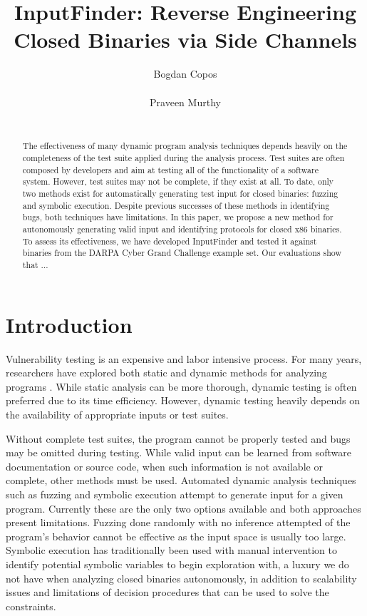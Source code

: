 \documentclass{acm_proc_article-sp}
\def \tool {InputFinder}
\begin{document}
\title{InputFinder: Reverse Engineering Closed Binaries via Side Channels}
\author{
\alignauthor
Bogdan Copos\\
	\\
\alignauthor
Praveen Murthy\\
	\\
}
\maketitle

\begin{abstract}
The effectiveness of many dynamic program analysis techniques depends heavily on the completeness of the test suite applied during the analysis process.
Test suites are often composed by developers and aim at testing all of the functionality of a software system.
However, test suites may not be complete, if they exist at all.
To date, only two methods exist for automatically generating test input for closed binaries: fuzzing and symbolic execution.
Despite previous successes of these methods in identifying bugs, both techniques have limitations.
In this paper, we propose a new method for autonomously generating valid input and identifying protocols for closed x86 binaries.
To assess its effectiveness, we have developed \tool{} and tested it against binaries from the DARPA Cyber Grand Challenge example set.
Our evaluations show that ...
\end{abstract}

\section{Introduction}
Vulnerability testing is an expensive and labor intensive process.
For many years, researchers have explored both static and dynamic methods for analyzing programs \cite{smartfuzzer}.
While static analysis can be more thorough, dynamic testing is often preferred due to its time efficiency.
However, dynamic testing heavily depends on the availability of appropriate inputs or test suites.

Without complete test suites, the program cannot be properly tested and bugs may be omitted during testing.
While valid input can be learned from software documentation or source code, when such information is not available or complete, other methods must be used.
Automated dynamic analysis techniques such as fuzzing and symbolic execution attempt to generate input for a given program.
Currently these are the only two options available and both approaches present limitations.
Fuzzing done randomly with no inference attempted of the program's behavior cannot be effective as the input space is usually too large.
Symbolic execution has traditionally been used with manual intervention to identify potential symbolic variables to begin exploration with, a luxury we do not have when analyzing closed binaries autonomously, in addition to scalability issues and limitations of decision procedures that can be used to solve the constraints.
\end{document}
